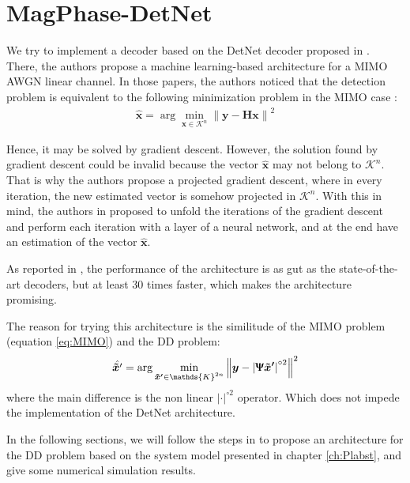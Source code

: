 \chapter{MagPhase-DetNet}
\newcommand{\DetNetImage}[1]{images/DetNet/#1}


We try to implement a decoder based on the DetNet decoder proposed in \cite{Neev_2017,Neev_2019}. There, the authors propose a  machine learning-based architecture for a MIMO AWGN linear channel. In those papers, the authors noticed that the detection problem is equivalent to the following minimization problem in the MIMO case \cite{Neev_2017}:
\begin{align}
	\hat{\bm x} = \arg \min_{\bm{x} \in \mathcal{K}^{n}} \left\lVert \bm y - \bm{H}\bm{x}  \right\rVert^2
	\label{eq:MIMO}
\end{align}

 Hence, it may be solved by gradient descent. However, the solution found by gradient descent could be invalid because the vector $\hat{\bm x}$ may not belong to $\mathcal K^n$. That is why the authors propose a projected gradient descent, where in every iteration, the new estimated vector is somehow projected in $\mathcal K^n$. With this in mind, the authors in \cite{Neev_2017,Neev_2019} proposed to unfold the iterations of the gradient descent and perform each iteration with a layer of a neural network, and at the end have an estimation of the vector $\hat{\bm x}$.
 
As reported in \cite{Neev_2017,Neev_2019}, the performance of the architecture is as gut as the state-of-the-art decoders, but at least 30 times faster, which makes the architecture promising.

The reason for trying this architecture is the similitude of the MIMO problem (equation \ref{eq:MIMO}) and the DD problem:
\begin{align}
	\hat{\bm{\tilde{x}}'} = \arg \min_{\bm{\tilde{x}'} \in \mathds{K}^{2n}} \left\lVert \bm y - \left|\bm{\Uppsi}\bm{\tilde{x}'}  \right|^{\circ2}\right\rVert^2
\end{align}
where the main difference is the non linear $|\cdot|^{\circ2}$ operator. Which does not impede the implementation of the DetNet architecture.

In the following sections, we will follow the steps in \cite{Neev_2019} to propose an architecture for the DD problem based on the system model presented in chapter \ref{ch:Plabst}, and give some numerical simulation results.


